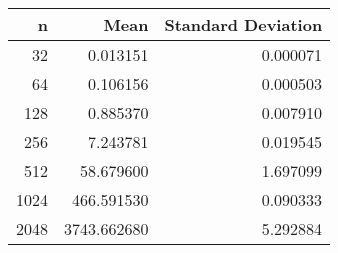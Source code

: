 \begin{tabular}{rrr}
\toprule
    n &         Mean &  Standard Deviation \\
\midrule
   32 &     0.013151 &            0.000071 \\
   64 &     0.106156 &            0.000503 \\
  128 &     0.885370 &            0.007910 \\
  256 &     7.243781 &            0.019545 \\
  512 &    58.679600 &            1.697099 \\
 1024 &   466.591530 &            0.090333 \\
 2048 &  3743.662680 &            5.292884 \\
\bottomrule
\end{tabular}
